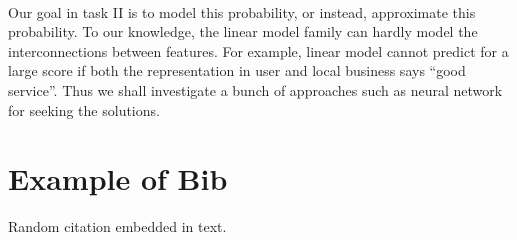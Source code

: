 \documentclass{article}
\begin{document}
\paragraph{} Our goal in task II is to model this probability, or instead, approximate this probability. To our knowledge, the linear model family can hardly model the interconnections between features. For example, linear model cannot predict for a large score if both the representation in user and local business says “good service”. Thus we shall investigate a bunch of approaches such as neural network for seeking the solutions.

\newpage
\section{Example of Bib}
Random citation \cite{LDA} embedded in text.



\end{document}
